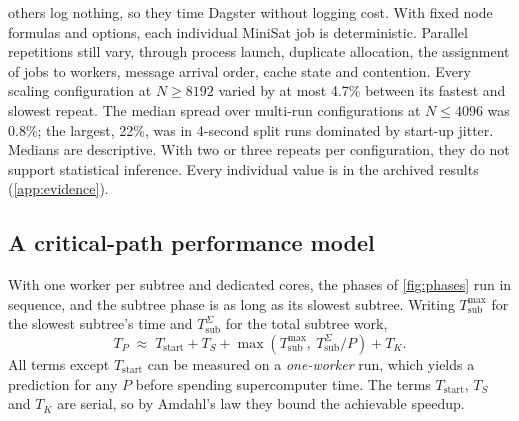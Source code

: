 \documentclass[11pt,a4paper]{article}
\newcommand{\Tstart}{T_{\mathrm{start}}}
\newcommand{\Tsub}{T_{\mathrm{sub}}}
\begin{document}
others log nothing, so they time Dagster without logging cost. With fixed node formulas and options, each individual MiniSat job is
deterministic. Parallel repetitions still vary, through process launch, duplicate
allocation, the assignment of jobs to workers, message arrival order, cache state and
contention. Every scaling configuration at $N\ge 8192$ varied by at most 4.7\% between its
fastest and slowest repeat. The median spread over multi-run configurations at $N\le 4096$
was 0.8\%; the largest, 22\%, was in 4-second split runs dominated by start-up jitter.
Medians are descriptive. With two or three repeats per configuration, they do not support
statistical inference. Every individual value is in the archived results
(\cref{app:evidence}).

\subsection{A critical-path performance model}
\label{sec:model}
With one worker per subtree and dedicated cores, the phases of \cref{fig:phases} run in
sequence, and the subtree phase is as long as its slowest subtree. Writing $\Tsub^{\max}$
for the slowest subtree's time and $\Tsub^{\Sigma}$ for the total subtree work,
\begin{equation}
T_P \;\approx\; \Tstart + T_S + \max\!\left(\Tsub^{\max},\ \Tsub^{\Sigma}/P\right) + T_K .
\label{eq:model}
\end{equation}
All terms except $\Tstart$ can be measured on a \emph{one-worker} run, which yields a
prediction for any $P$ before spending supercomputer time. The terms $\Tstart$, $T_S$ and
$T_K$ are serial, so by Amdahl's law they bound the achievable speedup.
\end{document}
